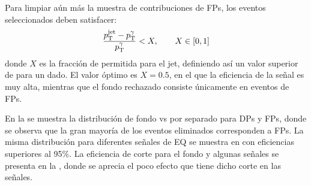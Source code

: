 Para limpiar aún más la muestra de contribuciones de \acp{FP}, los eventos seleccionados deben satisfacer:
\begin{equation}
    \label{eq:evt_selection:sr_opt:jet_pt:jet_pt_rel_X}
    \frac{p_{\text{T}}^\text{jet} - p_{\text{T}}^{\gamma}}{p_{\text{T}}^{\gamma}} < X, \qquad X \in [0, 1]
\end{equation}
donde \(X\) es la fracción de \ptgam permitida para el jet, definiendo así un valor superior de \ptjet para un \ptgam dado. El valor óptimo es \(X=0.5\), en el que la eficiencia de la señal es muy alta, mientras que el fondo rechazado consiste únicamente en eventos de \acp{FP}.

En la \Fig{\ref{fig:evt_selection:sr_opt:jet_pt:ptgam_ptjet_X0.5}} se muestra la distribución de fondo \ptgam vs \ptjet por separado para \acp{DP} y \acp{FP}, donde se observa que la gran mayoría de los eventos eliminados corresponden a \acp{FP}. La misma distribución para diferentes señales de \ac{EQ} se muestra en \Fig{\ref{fig:evt_selection:sr_opt:jet_pt:ptgam_ptjet_signals}} con eficiencias superiores al 95\%. La eficiencia de corte para el fondo y algunas señales \qstar se presenta en la \Tab{\ref{tab:evt_selection:sr_opt:jet_pt:efficiency_selection}}, donde se aprecia el poco efecto que tiene dicho corte en las señales.


